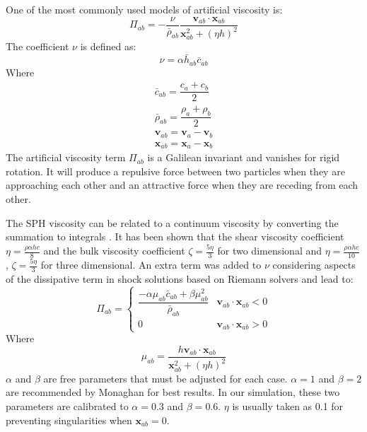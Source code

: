 \documentclass[journal abbreviation, manuscript]{copernicus}
\begin{document}
One of the most commonly used models of artificial viscosity is:
\begin{equation}
\Pi_{ab}=- \frac{\nu}{\bar{\rho}_{ab}} \dfrac{ \textbf{v}_{ab} \cdot \textbf{x}_{ab}}{\textbf{x}_{ab}^2 + (\eta h)^2}
\label{eq:art-vis-original}
\end{equation}
The coefficient $\nu$ is defined as:
\begin{equation}
\nu = \alpha \bar{h}_{ab} \bar{c}_{ab}
\end{equation}
Where 
\begin{align}
\bar{c}_{ab} = \dfrac{c_a + c_b}{2} \\
\bar{\rho}_{ab} = \dfrac{\rho_a + \rho_b}{2} \\
\textbf{v}_{ab}=\textbf{v}_a-\textbf{v}_b \\
\textbf{x}_{ab}=\textbf{x}_a-\textbf{x}_b
\end{align}
The artificial viscosity term $\Pi_{ab}$ is a Galilean invariant and vanishes for rigid rotation. It will produce a repulsive force between two particles when they are approaching each other and an attractive force when they are receding from each other. 

The SPH viscosity can be related to a continuum viscosity by converting the summation to integrals \citep{monaghan2005smoothed}. It has been shown that the shear viscosity coefficient $\eta = \frac{\rho \alpha h c}{8} $ and the bulk viscosity coefficient $ \zeta = \frac{5 \eta}{3}$ for two dimensional and $\eta = \frac{\rho \alpha h c}{10} $ , $ \zeta = \frac{5 \eta}{3}$ for three dimensional.
An extra term was added to $\nu$ considering aspects of the dissipative term in shock solutions based on Riemann solvers and lead to:
\begin{equation}
\Pi_{ab} = 
\begin{cases} 
      \dfrac{- \alpha \mu_{ab} \bar{c}_{ab} + \beta \mu_{ab}^2} {\bar{\rho}_{ab}} & \textbf{v}_{ab} \cdot \textbf{x}_{ab} < 0\\
      0 & \textbf{v}_{ab} \cdot \textbf{x}_{ab} > 0
\end{cases}
\label{eq:art-vis-shock}
\end{equation}
Where
\begin{equation}
\mu_{ab} = \dfrac{h \textbf{v}_{ab} \cdot \textbf{x}_{ab}}{\textbf{x}_{ab}^2 + (\eta h)^2} 
\end{equation}
$\alpha$ and $\beta$ are free parameters that must be adjusted for each case. $\alpha = 1$ and $\beta = 2$ are  recommended by Monaghan for best results. In our simulation, these two parameters are calibrated to  $\alpha = 0.3$ and $\beta = 0.6$. $\eta$ is usually taken as 0.1 for preventing singularities when $\textbf{x}_{ab} = 0$.
\end{document}
